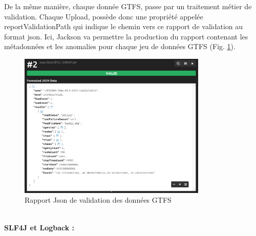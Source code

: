 \begin{itemize}
De la même manière, chaque donnée GTFS, passe par un traitement métier de validation. Chaque Upload, possède donc une propriété appelée \og reportValidationPath \fg qui indique le chemin vers ce rapport de validation au format json. Ici, Jackson va permettre la production du rapport contenant les métadonnées et les anomalies pour chaque jeu de données GTFS (Fig. \ref{fig:Json2}).
\\
\begin{figure}[h]
	\centering
		\includegraphics[width=0.8\textwidth]{images/JsonFormatter_serialization_Validation.PNG}
	\caption{Rapport Json de validation des données GTFS}
	\label{fig:Json2}
\end{figure}\\


\textbf{SLF4J et Logback :} 


\end{itemize}
